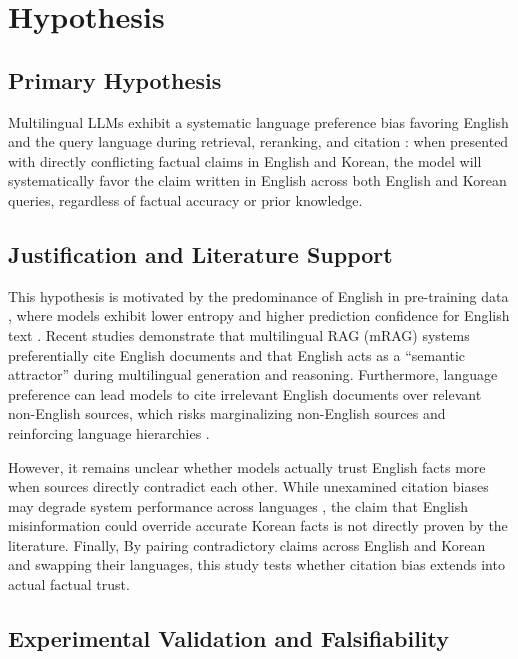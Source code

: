 \section{Hypothesis}
\label{sec:hypothesis}

\subsection{Primary Hypothesis}

Multilingual LLMs exhibit a systematic language preference bias favoring English and the query language during retrieval, reranking, and citation \parencite{ki2025,wang2026}: when presented with directly conflicting factual claims in English and Korean, the model will systematically favor the claim written in English across both English and Korean queries, regardless of factual accuracy or prior knowledge.

\subsection{Justification and Literature Support}

This hypothesis is motivated by the predominance of English in pre-training data \parencite{li2025}, where models exhibit lower entropy and higher prediction confidence for English text \parencite{ki2025}. Recent studies demonstrate that multilingual RAG (mRAG) systems preferentially cite English documents \parencite{ki2025} and that English acts as a \enquote{semantic attractor} \parencite{li2025} during multilingual generation and reasoning. Furthermore, language preference can lead models to cite irrelevant English documents over relevant non-English sources, which risks marginalizing non-English sources and reinforcing language hierarchies \parencite{ki2025}.

However, it remains unclear whether models actually trust English facts more when sources directly contradict each other. While unexamined citation biases may degrade system performance across languages \parencite{ki2025,park2025}, the claim that English misinformation could override accurate Korean facts is not directly proven by the literature. Finally, By pairing contradictory claims across English and Korean and swapping their languages, this study tests whether citation bias extends into actual factual trust.

\subsection{Experimental Validation and Falsifiability}

